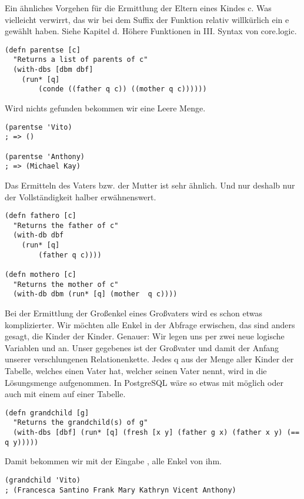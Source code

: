 Ein ähnliches Vorgehen für die Ermittlung der Eltern eines Kindes \dq{}c\dq{}. Was vielleicht verwirrt, das wir bei dem Suffix der Funktion relativ willkürlich ein e gewählt haben. Siehe Kapitel d. Höhere Funktionen in III. Syntax von core.logic.

\begin{lstlisting}
(defn parentse [c] 
  "Returns a list of parents of c"
  (with-dbs [dbm dbf] 
	(run* [q] 
		(conde ((father q c)) ((mother q c))))))
\end{lstlisting}

Wird nichts gefunden bekommen wir eine Leere Menge.

\begin{lstlisting}
(parentse 'Vito)
; => ()

(parentse 'Anthony)
; => (Michael Kay)
\end{lstlisting}

Das Ermitteln des Vaters bzw. der Mutter ist sehr ähnlich. Und nur deshalb nur der Vollständigkeit halber erwähnenswert.

\begin{lstlisting}
(defn fathero [c]
  "Returns the father of c"
  (with-db dbf 
	(run* [q] 
		(father q c))))

(defn mothero [c]
  "Returns the mother of c"
  (with-db dbm (run* [q] (mother  q c))))
\end{lstlisting}

Bei der Ermittlung der Großenkel eines Großvaters wird es schon etwas komplizierter. Wir möchten alle Enkel in der Abfrage erwischen, das sind anders gesagt, die Kinder der Kinder. Genauer: Wir legen uns per  zwei neue logische Variablen  und  an. Unser gegebenes  ist der Großvater und damit der Anfang unserer \dq{}verschlungenen\dq{} Relationenkette. Jedes q aus der Menge aller Kinder der  Tabelle, welches einen Vater  hat, welcher  seinen Vater nennt, wird in die Lösungsmenge aufgenommen. In PostgreSQL wäre so etwas mit  möglich oder auch mit einem  auf einer Tabelle.

\begin{lstlisting}
(defn grandchild [g]
  "Returns the grandchild(s) of g"
  (with-dbs [dbf] (run* [q] (fresh [x y] (father g x) (father x y) (== q y)))))
\end{lstlisting}

Damit bekommen wir mit der Eingabe , alle Enkel von ihm.

\begin{lstlisting}
(grandchild 'Vito)
; (Francesca Santino Frank Mary Kathryn Vicent Anthony)
\end{lstlisting}

